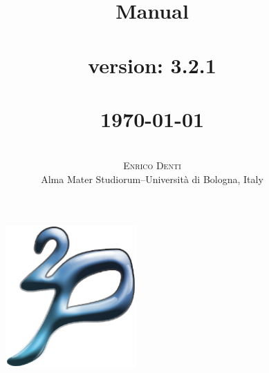 \documentclass[11pt]{report}
\title{{\Huge{\bf{\tuprolog{} Manual\\\mbox{ }\\}}}
        \tuprolog{} version: 3.2.1\\\mbox{ }\\
{\small\today\\}
}
\author{ \mbox{ }\\ \textsc{Enrico Denti}\\Alma Mater Studiorum--Universit\`{a} di Bologna, Italy
}
\date{}
\newcommand\logo{
    \begin{figure}[tp]
        \begin{center}
            \includegraphics[width=5cm]{images/logo}
        \end{center}
\end{figure}
}
\begin{document}
\logo

\maketitle

\tableofcontents













\end{document}
